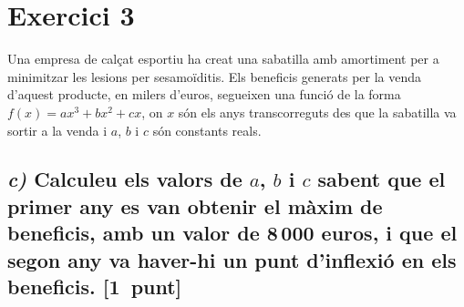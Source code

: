 \documentclass[11pt,a4paper]{article}
\begin{document}
\section*{\textcolor{blauPista}{Exercici 3}}

\noindent Una empresa de calçat esportiu ha creat una sabatilla amb amortiment per a minimitzar les lesions per sesamoïditis. Els beneficis generats per la venda d'aquest producte, en milers d'euros, segueixen una funció de la forma $f(x) = ax^{3} + bx^{2} + cx$, on $x$ són els anys transcorreguts des que la sabatilla va sortir a la venda i $a$, $b$ i $c$ són constants reals.

\subsection*{\textit{c)} \normalfont Calculeu els valors de $a$, $b$ i $c$ sabent que el primer any es van obtenir el màxim de beneficis, amb un valor de 8\,000 euros, i que el segon any va haver-hi un punt d'inflexió en els beneficis. \hfill\textnormal{[1~punt]}}

\end{document}
